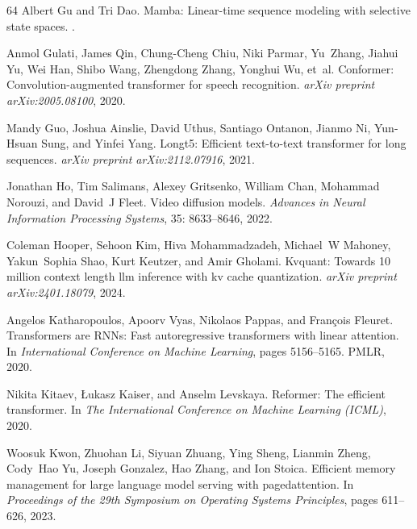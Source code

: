 \documentclass{article}
\begin{document}
\begin{thebibliography}{64}
Albert Gu and Tri Dao.
\newblock Mamba: Linear-time sequence modeling with selective state spaces.
.

Anmol Gulati, James Qin, Chung-Cheng Chiu, Niki Parmar, Yu~Zhang, Jiahui Yu,
  Wei Han, Shibo Wang, Zhengdong Zhang, Yonghui Wu, et~al.
\newblock Conformer: Convolution-augmented transformer for speech recognition.
\newblock \emph{arXiv preprint arXiv:2005.08100}, 2020.

Mandy Guo, Joshua Ainslie, David Uthus, Santiago Ontanon, Jianmo Ni, Yun-Hsuan
  Sung, and Yinfei Yang.
\newblock Longt5: Efficient text-to-text transformer for long sequences.
\newblock \emph{arXiv preprint arXiv:2112.07916}, 2021.

Jonathan Ho, Tim Salimans, Alexey Gritsenko, William Chan, Mohammad Norouzi,
  and David~J Fleet.
\newblock Video diffusion models.
\newblock \emph{Advances in Neural Information Processing Systems},
  35: 8633--8646, 2022.

Coleman Hooper, Sehoon Kim, Hiva Mohammadzadeh, Michael~W Mahoney, Yakun~Sophia
  Shao, Kurt Keutzer, and Amir Gholami.
\newblock Kvquant: Towards 10 million context length llm inference with kv
  cache quantization.
\newblock \emph{arXiv preprint arXiv:2401.18079}, 2024.

Angelos Katharopoulos, Apoorv Vyas, Nikolaos Pappas, and Fran{\c{c}}ois
  Fleuret.
\newblock Transformers are {RNN}s: Fast autoregressive transformers with linear
  attention.
\newblock In \emph{International Conference on Machine Learning}, pages
  5156--5165. PMLR, 2020.

Nikita Kitaev, {\L}ukasz Kaiser, and Anselm Levskaya.
\newblock Reformer: The efficient transformer.
\newblock In \emph{The International Conference on Machine Learning ({ICML})},
  2020.

Woosuk Kwon, Zhuohan Li, Siyuan Zhuang, Ying Sheng, Lianmin Zheng, Cody~Hao Yu,
  Joseph Gonzalez, Hao Zhang, and Ion Stoica.
\newblock Efficient memory management for large language model serving with
  pagedattention.
\newblock In \emph{Proceedings of the 29th Symposium on Operating Systems
  Principles}, pages 611--626, 2023.


\end{thebibliography}
\end{document}
